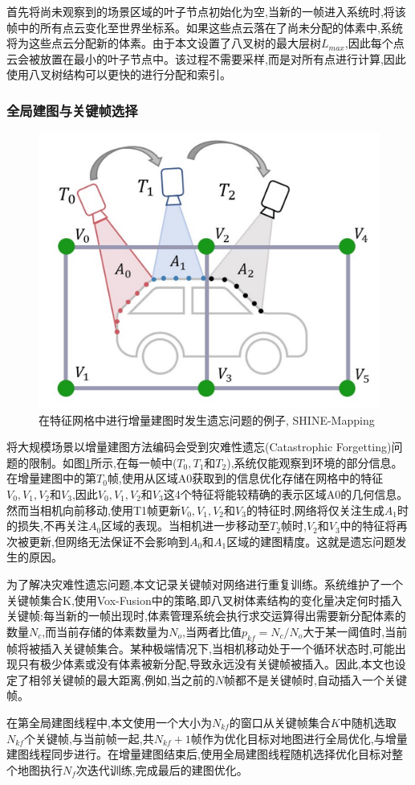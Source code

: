 首先将尚未观察到的场景区域的叶子节点初始化为空,当新的一帧进入系统时,将该帧中的所有点云变化至世界坐标系。如果这些点云落在了尚未分配的体素中,系统将为这些点云分配新的体素。由于本文设置了八叉树的最大层树$L_{max}$,因此每个点云会被放置在最小的叶子节点中。该过程不需要采样,而是对所有点进行计算,因此使用八叉树结构可以更快的进行分配和索引。
\subsubsection{全局建图与关键帧选择}\label{forgettingsection}
\begin{figure}[htbp]
    \includegraphics[scale = 0.2]{figures/forgetting.jpg}
    \centering
    \caption{在特征网格中进行增量建图时发生遗忘问题的例子, SHINE-Mapping\cite{shine}} \label{forgetting}
\end{figure}
将大规模场景以增量建图方法编码会受到灾难性遗忘(Catastrophic Forgetting)问题的限制。如图\ref{forgetting}所示,在每一帧中($T_0, T_1$和$T_2$),系统仅能观察到环境的部分信息。在增量建图中的第$T_0$帧,使用从区域A0获取到的信息优化存储在网格中的特征$V_0, V_1, V_2$和$V_3$,因此$V_0, V_1, V_2$和$V_3$这4个特征将能较精确的表示区域A0的几何信息。然而当相机向前移动,使用T1帧更新$V_0, V_1, V_2$和$V_3$的特征时,网络将仅关注生成$A_1$时的损失,不再关注$A_0$区域的表现。当相机进一步移动至$T_2$帧时,$V_2$和$V_3$中的特征将再次被更新,但网络无法保证不会影响到$A_0$和$A_1$区域的建图精度。这就是遗忘问题发生的原因。

为了解决灾难性遗忘问题,本文记录关键帧对网络进行重复训练。系统维护了一个关键帧集合K,使用Vox-Fusion中的策略,即八叉树体素结构的变化量决定何时插入关键帧:每当新的一帧出现时,体素管理系统会执行求交运算得出需要新分配体素的数量$N_c$,而当前存储的体素数量为$N_o$,当两者比值$p_{kf}=N_c/N_o$大于某一阈值时,当前帧将被插入关键帧集合。某种极端情况下,当相机移动处于一个循环状态时,可能出现只有极少体素或没有体素被新分配,导致永远没有关键帧被插入。因此,本文也设定了相邻关键帧的最大距离,例如,当之前的$N$帧都不是关键帧时,自动插入一个关键帧。

在第全局建图线程中,本文使用一个大小为$N_{kf}$的窗口从关键帧集合$K$中随机选取$N_{kf}$个关键帧,与当前帧一起,共$N_{kf}+1$帧作为优化目标对地图进行全局优化,与增量建图线程同步进行。在增量建图结束后,使用全局建图线程随机选择优化目标对整个地图执行$N_f$次迭代训练,完成最后的建图优化。
